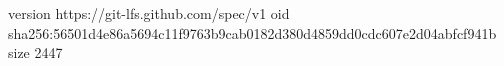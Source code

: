 version https://git-lfs.github.com/spec/v1
oid sha256:56501d4e86a5694c11f9763b9cab0182d380d4859dd0cdc607e2d04abfcf941b
size 2447
